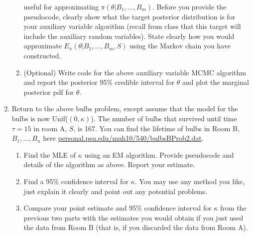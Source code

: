 \documentclass[10pt]{article}
\begin{document}
\begin{enumerate}
\begin{enumerate}
  useful for approximating $\pi(\theta| B_1,\dots, B_m)$. Before you
  provide the pseudocode, clearly show what the target posterior
  distribution is for your auxiliary variable algorithm (recall from
  class that this target will include the auxiliary random
  variables). State clearly how you would approximate
  $E_{\pi}(\theta|B_1,\dots,B_m, S)$ using the Markov chain you have
  constructed.
\item (Optional) Write code for the above auxiliary variable MCMC algorithm and report the posterior 95\% credible interval for $\theta$ and plot the marginal posterior pdf for $\theta$.
\end{enumerate}
\item Return to the above bulbs problem, except assume that the model for the bulbs is now Unif($(0,\kappa)$). The number of bulbs that survived until time $\tau=15$ in room A, $S$, is 167. You can find the lifetime  of bulbs in Room B, $B_1,\dots, B_n$ here \url{personal.psu.edu/muh10/540/bulbsBProb2.dat}. 
\begin{enumerate}
\item Find the MLE of $\kappa$ using an EM algorithm. Provide pseudocode and details of the algorithm as above. Report your estimate.
\item Find a 95\% confidence interval for $\kappa$. You may use any method you like, just explain it clearly and point out any potential problems. 
\item Compare your point estimate and 95\% confidence interval for $\kappa$ from the previous two parts with the estimates you would obtain if you just used the data from Room B (that is, if you discarded the data from Room A).
\end{enumerate}
\end{enumerate}
\end{document}
